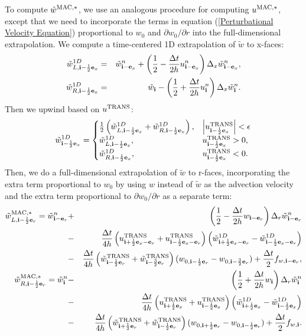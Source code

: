 \documentclass[11pt]{article}
\def\half  {\frac{1}{2}}
\def\dt    {\Delta t}
\def\mac   {\rm MAC}
\def\trans {\rm TRANS}
\def\eb    {{\bf e}}
\def\ib    {{\bf i}}
\def\wt    {\tilde{w}}
\begin{document}
To compute $\wt^{\mac,*}$, we use an analogous procedure for computing $u^{\mac,*}$, except that we need to incorporate the terms in equation (\ref{Perturbational Velocity Equation}) proportional to $w_0$ and $\partial w_0/\partial r$ into the full-dimensional extrapolation.  We compute a time-centered 1D extrapolation of $\wt$ to x-faces:
\begin{eqnarray}
\wt_{L,\ib-\half\eb_x}^{1D} &=& \wt_{\ib-\eb_x}^n + \left(\half - \frac{\dt}{2h}u_{\ib-\eb_x}^n\right)\Delta_x \wt_{\ib-\eb_x}^n, \\
\wt_{R,\ib-\half\eb_x}^{1D} &=& \wt_{\ib} - \left(\half + \frac{\dt}{2h}u_{\ib}^n\right)\Delta_x \wt_{\ib}^n.
\end{eqnarray}
Then we upwind based on $u^{\trans}$:
\begin{equation}
\wt_{\ib-\half\eb_x}^{1D} =
\begin{cases}
\half\left(\wt_{L,\ib-\half\eb_x}^{1D} + \wt_{R,\ib-\half\eb_x}^{1D}\right), & \left|u^{\trans}_{\ib-\half\eb_x}\right| < \epsilon \\
\wt_{L,\ib-\half\eb_x}^{1D}, & u^{\trans}_{\ib-\half\eb_x} > 0, \\
\wt_{R,\ib-\half\eb_x}^{1D}, & u^{\trans}_{\ib-\half\eb_x} < 0. \\
\end{cases}
\end{equation}
Then, we do a full-dimensional extrapolation of $\wt$ to r-faces, incorporating the extra term proportional to $w_0$ by using $w$ instead of $\wt$ as the advection velocity and the extra term proportional to $\partial w_0/\partial r$ as a separate term:
\begin{eqnarray}
\wt_{L,\ib-\half\eb_r}^{\mac,*} = \wt_{\ib-\eb_r}^n &+& \left(\half - \frac{\dt}{2h}w_{\ib-\eb_r}\right)\Delta_r \wt_{\ib-\eb_r}^n \nonumber \\
&-& \frac{\dt}{4h}\left(u_{\ib+\half\eb_x-\eb_r}^{\trans}+u_{\ib-\half\eb_x-\eb_r}^{\trans}\right)\left(\wt_{\ib+\half\eb_x-\eb_r}^{1D} - \wt_{\ib-\half\eb_x-\eb_r}^{1D}\right) \nonumber \\
&-& \frac{\dt}{4h}\left(\wt_{\ib-\half\eb_r}^{\trans}+\wt_{\ib-\frac{3}{2}\eb_r}^{\trans}\right)(w_{0,\ib-\half\eb_r} - w_{0,\ib-\frac{3}{2}\eb_r}) + \frac{\dt}{2}f_{w,\ib-\eb_r},\label{wt_L Extrapolation} \\
\wt_{R,\ib-\half\eb_r}^{\mac,*} = \wt_{\ib}^n &-& \left(\half + \frac{\dt}{2h}w_{\ib}\right)\Delta_r \wt_{\ib}^n \nonumber \\
&-& \frac{\dt}{4h}\left(u_{\ib+\half\eb_x}^{\trans}+u_{\ib-\half\eb_x}^{\trans}\right)\left(\wt_{\ib+\half\eb_x}^{1D} - \wt_{\ib-\half\eb_x}^{1D}\right) \nonumber \\
&-& \frac{\dt}{4h}\left(\wt_{\ib+\half\eb_r}^{\trans}+\wt_{\ib-\half\eb_r}^{\trans}\right)(w_{0,\ib+\half\eb_r} - w_{0,\ib-\half\eb_r}) + \frac{\dt}{2}f_{w,\ib}.\label{wt_R Extrapolation}
\end{eqnarray}
\end{document}
